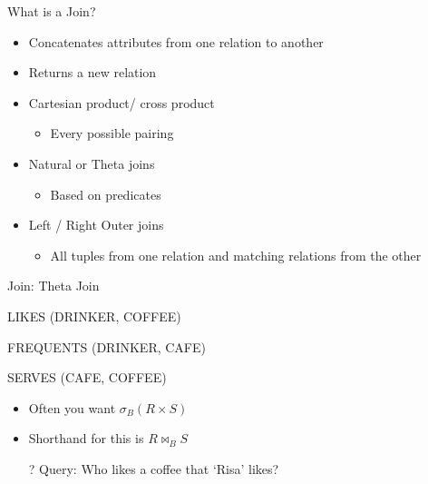 \documentclass[aspectratio=169]{beamer}
\begin{document}

\begin{frame}{What is a Join?}
\begin{itemize}
\item Concatenates attributes from one relation to another
\item Returns a new relation
\item Cartesian product/ cross product 
\begin{itemize}
\item Every possible pairing
\end{itemize}
\item Natural or Theta joins 
\begin{itemize}
\item Based on predicates 
\end{itemize}
\item Left / Right Outer joins
\begin{itemize}
\item All tuples from one relation and matching relations from the other
\end{itemize}
\end{itemize}

\end{frame}


\begin{frame}{Join: Theta Join}

LIKES (DRINKER, COFFEE)

FREQUENTS (DRINKER, CAFE)

SERVES (CAFE, COFFEE)

\begin{itemize}
\item Often you want $\sigma_B (R \times S)$
\item Shorthand for this is $R \bowtie_B S$
\item[?] Query: Who likes a coffee that `Risa' likes?
\end{itemize}
\end{frame}

\end{document}
